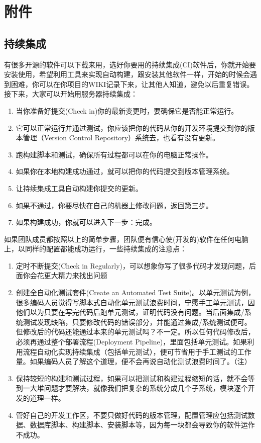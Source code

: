\hypertarget{ux9644ux4ef6}{%
\section{附件}\label{ux9644ux4ef6}}

\hypertarget{ux6301ux7eedux96c6ux6210-1}{%
\subsection{持续集成}\label{ux6301ux7eedux96c6ux6210-1}}

有很多开源的软件可以下载来用，选好你要用的持续集成(CI)软件后，你就开始要安装使用，希望利用工具来实现自动构建，跟安装其他软件一样，开始的时候会遇到困难，你可以在你项目的WIKI记录下来，让其他人知道，避免以后重复错误。接下来，大家可以开始用服务器持续集成：

\begin{enumerate}
\tightlist
\item
  当你准备好提交(Check in)你的最新变更时，要确保它是否能正常运行。
\item
  它可以正常运行并通过测试，你应该把你的代码从你的开发环境提交到你的版本管理（Version
  Control Repository）系统去，也看有没有更新。
\item
  跑构建脚本和测试，确保所有过程都可以在你的电脑正常操作。
\item
  如果你在本地构建成功通过，就可以把你的代码提交到版本管理系统。
\item
  让持续集成工具自动构建你提交的更新。
\item
  如果不通过，你要尽快在自己的机器上修改问题，返回第三步。
\item
  如果构建成功，你就可以进入下一步：完成。
\end{enumerate}

如果团队成员都按照以上的简单步骤，团队便有信心使(开发的)软件在任何电脑上，以同样的配置都能成功运行，一些持续集成的注意点：

\begin{enumerate}
\tightlist
\item
  定时不断提交(Check in
  Regularly)，可以想象你写了很多代码才发现问题，后面你会花更大精力来找出问题
\item
  创建全自动化测试套件(Create an Automated Test
  Suite)。以单元测试为例，很多编码人员觉得写脚本式自动化单元测试浪费时间，宁愿手工单元测试，因他们以为只要在写完代码后跑单元测试，证明代码没有问题。当后面集成/系统测试发现缺陷，只要修改代码的错误部分，并能通过集成/系统测试便可。但修改后的代码还能通过本来的单元测试吗？不一定。所以任何代码修改后，必须再通过整个部署流程(Deployment
  Pipeline)，里面包括单元测试。如果利用流程自动化实现持续集成（包括单元测试），便可节省用于手工测试的工作量。如果编码人员了解这个道理，便不会再说自动化测试浪费时间了。（注）
\item
  保持较短的构建和测试过程，如果可以把测试和构建过程缩短的话，就不会等到一大堆问题才要解决，就像我们把复杂的系统分成几个子系统，模块逐个开发的道理一样。
\item
  管好自己的开发工作区，不要只做好代码的版本管理，配置管理应包括测试数据、数据库脚本、构建脚本、安装脚本等，因为每一块都会导致你的软件运作不成功。
\end{enumerate}


